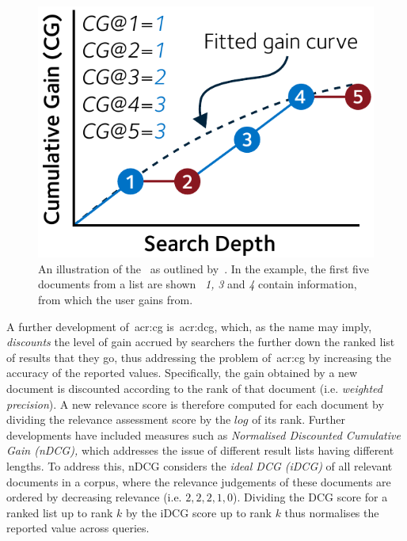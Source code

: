 \begin{figure}
    \begin{center}
    \vspace*{-10mm}
    \includegraphics[width=1\textwidth]{figures/ch2-cg.pdf}
    \end{center}
    \vspace*{-4mm}
    \caption[Example plot of~\gls{acr:cg} accumulation]{An illustration of the~ as outlined by~\cite{jarvelin2000cg, jarvelin2002cg}. In the example, the first five documents from a list are shown \textemdash~\emph{1,} \emph{3} and \emph{4} contain information, from which the user gains from.}
    \label{fig:cg}
\end{figure}

A further development of~\gls{acr:cg} is~\gls{acr:dcg}, which, as the name may imply, \emph{discounts} the level of gain accrued by searchers the further down the ranked list of results that they go, thus addressing the problem of~\gls{acr:cg} by increasing the accuracy of the reported values. Specifically, the gain obtained by a new document is discounted according to the rank of that document (i.e. \emph{weighted precision}). A new relevance score is therefore computed for each document by dividing the relevance assessment score by the $log$ of its rank. Further developments have included measures such as \emph{Normalised Discounted Cumulative Gain (nDCG),} which addresses the issue of different result lists having different lengths. To address this, nDCG considers the \emph{ideal DCG (iDCG)} of all relevant documents in a corpus, where the relevance judgements of these documents are ordered by decreasing relevance (i.e. $2,2,2,1,0$). Dividing the DCG score for a ranked list up to rank $k$ by the iDCG score up to rank $k$ thus normalises the reported value across queries.

